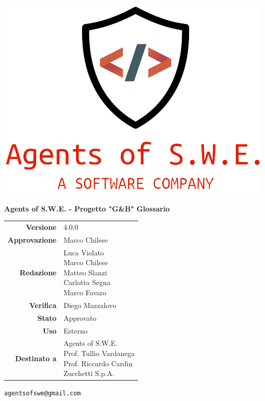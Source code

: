 


\begin{titlepage}
\thispagestyle{empty}

\begin{center}

\includegraphics[scale=0.3]{./images/logo.png} 

\large \textbf{Agents of S.W.E. - Progetto "G\&B"}
\vfill
\Huge \textbf{Glossario}
\vfill
\large
\renewcommand{\arraystretch}{1.3}
\begin{tabular}{r|l}
\textbf{Versione} & 4.0.0 \\
\textbf{Approvazione} & Marco Chilese\\
\textbf{Redazione} & \parbox[t]{5cm}{Luca Violato\\Marco Chilese\\Matteo Slanzi\\Carlotta Segna\\ Marco Favaro}\\
\textbf{Verifica} & \parbox[t]{5cm}{Diego Mazzalovo}\\
\textbf{Stato} & Approvato \\
\textbf{Uso} & Esterno\\
\textbf{Destinato a} & \parbox[t]{5cm}{Agents of S.W.E. \\Prof. Tullio Vardanega\\Prof. Riccardo Cardin\\ Zucchetti S.p.A.}
\end{tabular}
\vfill
\small
\texttt{agentsofswe@gmail.com}
\end{center}
\end{titlepage}

